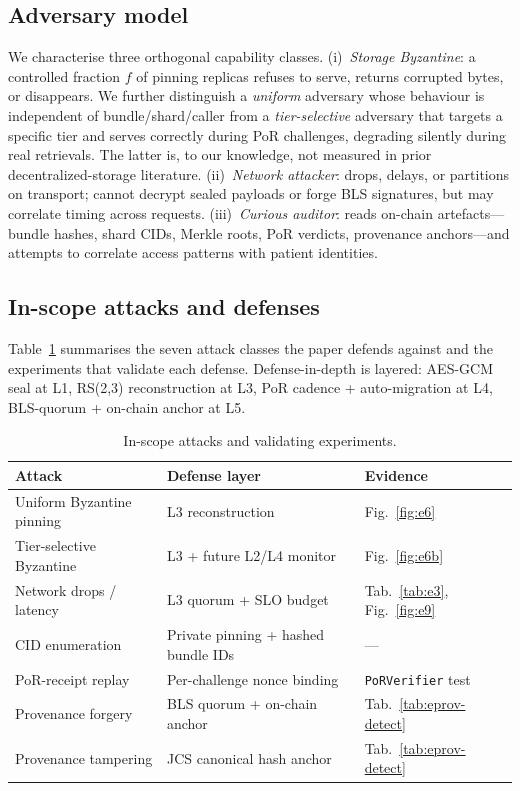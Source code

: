 \subsection{Adversary model}
\label{sec:model:adversary}

We characterise three orthogonal capability classes. (i)~\emph{Storage Byzantine}: a controlled fraction \(f\) of pinning replicas refuses to serve, returns corrupted bytes, or disappears. We further distinguish a \emph{uniform} adversary whose behaviour is independent of bundle/shard/caller from a \emph{tier-selective} adversary that targets a specific tier and serves correctly during PoR challenges, degrading silently during real retrievals. The latter is, to our knowledge, not measured in prior decentralized-storage literature. (ii)~\emph{Network attacker}: drops, delays, or partitions on transport; cannot decrypt sealed payloads or forge BLS signatures, but may correlate timing across requests. (iii)~\emph{Curious auditor}: reads on-chain artefacts---bundle hashes, shard CIDs, Merkle roots, PoR verdicts, provenance anchors---and attempts to correlate access patterns with patient identities.

\subsection{In-scope attacks and defenses}
\label{sec:model:attacks}

Table~\ref{tab:attacks} summarises the seven attack classes the paper defends against and the experiments that validate each defense. Defense-in-depth is layered: AES-GCM seal at L1, RS(2,3) reconstruction at L3, PoR cadence + auto-migration at L4, BLS-quorum + on-chain anchor at L5.

\begin{table}[!t]
\caption{In-scope attacks and validating experiments.}
\label{tab:attacks}
\centering
\small
\begin{tabular}{@{}lll@{}}
\toprule
Attack & Defense layer & Evidence \\
\midrule
Uniform Byzantine pinning  & L3 reconstruction & Fig.~\ref{fig:e6} \\
Tier-selective Byzantine   & L3 + future L2/L4 monitor & Fig.~\ref{fig:e6b} \\
Network drops / latency    & L3 quorum + SLO budget & Tab.~\ref{tab:e3}, Fig.~\ref{fig:e9} \\
CID enumeration            & Private pinning + hashed bundle IDs & --- \\
PoR-receipt replay         & Per-challenge nonce binding & \texttt{PoRVerifier} test \\
Provenance forgery         & BLS quorum + on-chain anchor & Tab.~\ref{tab:eprov-detect} \\
Provenance tampering       & JCS canonical hash anchor & Tab.~\ref{tab:eprov-detect} \\
\bottomrule
\end{tabular}
\end{table}

